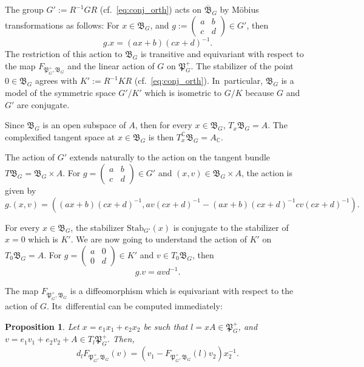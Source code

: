 \documentclass[oneside,11pt]{amsart}
\newtheorem{prop}[thm]{Proposition}
\theoremstyle{definition}
\theoremstyle{remark}
\numberwithin{thm}{section}
\numberwithin{equation}{section}
\begin{document}
The group $G':=R^{-1}GR$ (cf.~\eqref{eq:conj_orth}) acts on $\overline{\mathfrak{B}}_G$ by M\"obius transformations as follows: For $x\in \mathfrak{B}_G$, and $g:=\begin{pmatrix}
    a & b\\
    c & d
\end{pmatrix}\in G'$, then 
\[g.x=(ax+b)(cx+d)^{-1}.\] 
The restriction of this action to $\mathfrak{B}_G$ is transitive and equivariant with respect to the map $F_{\mathfrak{P}_G^+,\mathfrak{B}_G}$ and the linear action of $G$ on $\mathfrak{P}_G^+$. The stabilizer of the point $0\in \mathfrak{B}_G$ agrees with $K':=R^{-1}KR$ (cf.~\eqref{eq:conj_orth}). In~particular, $\mathfrak{B}_G$ is a model of the symmetric space $G'/K'$ which is isometric to $G/K$ because $G$ and $G'$ are conjugate. 

Since $\mathfrak{B}_G$ is an open subspace of $A$, then for every $x\in \mathfrak{B}_G$, $T_x\mathfrak{B}_G = A$. The complexified tangent space at $x\in \mathfrak{B}_G$ is then $T^\mathbb C_x\mathfrak{B}_G = A_\mathbb C$.

The action of $G'$ extends naturally to the action on the tangent bundle $T\mathfrak{B}_G=\mathfrak{B}_G\times A$. For $g=\begin{pmatrix}
        a & b \\
        c & d
    \end{pmatrix}\in G'$
and $(x,v)\in \mathfrak{B}_G\times A$, the action is given by
$$g.(x,v)=\left((ax+b)(cx+d)^{-1}, av(cx+d)^{-1}-(ax+b)(cx+d)^{-1}cv(cx+d)^{-1}\right).$$

For every $x\in\mathfrak B_G$, the stabilizer $\mathrm{Stab}_{G'}(x)$ is conjugate to the stabilizer of $x=0$ which is $K'$. We are now going to understand the action of $K'$ on $T_0\mathfrak B_G= A$. For $g=\begin{pmatrix}
    a & 0 \\
    0 & d
\end{pmatrix}\in K'$ and $v\in T_0\mathfrak B_G$, then
$$g.v=avd^{-1}.$$

The map $F_{\mathfrak{P}_G^+,\mathfrak{B}_G}$ is a diffeomorphism which is equivariant with respect to the action of $G$. Its~differential can be computed immediately:

\begin{prop}
    Let $x=e_1x_1+e_2x_2$ be such that $l=xA\in\mathfrak{P}_G^+$, and $v=e_1v_1+e_2v_2+A\in T_{l}\mathfrak{P}_G^+$. Then, 
    $$d_{l}F_{\mathfrak{P}_G^+,\mathfrak{B}_G}(v)=(v_1-F_{\mathfrak{P}_G^+,\mathfrak{B}_G}(l) v_2)x_2^{-1}.$$
\end{prop}
\end{document}
